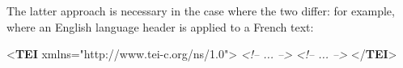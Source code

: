 The latter approach is necessary in the case where the two differ: for example, where an English language header is applied to a French text: \par\bgroup{}\exampleFont \begin{shaded}\noindent\mbox{}{<\textbf{TEI} xmlns="http://www.tei-c.org/ns/1.0">}\mbox{}\newline 
{}\mbox{}\newline 
\textit{<!-- ... -->}\mbox{}\newline 
{}\mbox{}\newline 
{}\mbox{}\newline 
\textit{<!-- ... -->}\mbox{}\newline 
{}\mbox{}\newline 
{</\textbf{TEI}>}\end{shaded}\egroup\par \par
